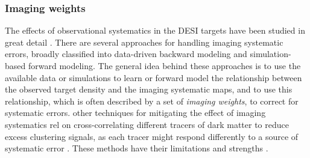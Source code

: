 \subsubsection{Imaging weights}
The effects of observational systematics in the DESI targets have been studied in great detail \cite[see, e.g.,][]{kitanidis2020imaging, zhou2021clustering, chaussidon2022angular}. There are several approaches for handling imaging systematic errors, broadly classified into data-driven backward modeling and simulation-based forward modeling. The general idea behind these approaches is to use the available data or simulations to learn or forward model the relationship between the observed target density and the imaging systematic maps, and to use this relationship, which is often described by a set of \textit{imaging weights}, to correct for systematic errors. other techniques for mitigating the effect of imaging systematics rel on cross-correlating different tracers of dark matter to reduce excess clustering signals, as each tracer might respond differently to a source of systematic error \citep[see, e.g.,][]{giannantonio2014improved}. These methods have their limitations and strengths \citep[see, e.g.,][for a review]{2021MNRAS.503.5061W}.


